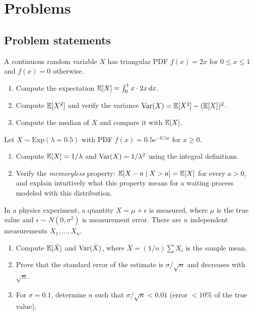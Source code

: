 \section*{Problems}

\subsection*{Problem statements}

\begin{problema}
	\label{prob:4e01dbd}
	A continuous random variable $X$ has triangular PDF $f(x) = 2x$ for $0 \le x \le 1$ and $f(x) = 0$ otherwise.
	\begin{enumerate}
		\item Compute the expectation $\mathbb{E}[X] = \int_{0}^{1} x \cdot 2x\,dx$.
		\item Compute $\mathbb{E}[X^{2}]$ and verify the variance $\operatorname{Var}(X) = \mathbb{E}[X^{2}] - (\mathbb{E}[X])^{2}$.
		\item Compute the median of $X$ and compare it with $\mathbb{E}[X]$.
	\end{enumerate}
\end{problema}

\begin{problema}
	\label{prob:f43c638}
	Let $X \sim \text{Exp}(\lambda = 0.5)$ with PDF $f(x) = 0.5 e^{-0.5 x}$ for $x \ge 0$.
	\begin{enumerate}
		\item Compute $\mathbb{E}[X] = 1/\lambda$ and $\operatorname{Var}(X) = 1/\lambda^{2}$ using the integral definitions.
		\item Verify the \emph{memoryless} property: $\mathbb{E}[X - a \mid X > a] = \mathbb{E}[X]$ for every $a > 0$, and explain intuitively what this property means for a waiting process modeled with this distribution.
	\end{enumerate}
\end{problema}

\begin{problema}
	\label{prob:7b147c4}
	In a physics experiment, a quantity $X = \mu + \epsilon$ is measured, where $\mu$ is the true value and $\epsilon \sim N(0, \sigma^{2})$ is measurement error. There are $n$ independent measurements $X_{1}, \dots, X_{n}$.
	\begin{enumerate}
		\item Compute $\mathbb{E}[\bar{X}]$ and $\operatorname{Var}(\bar{X})$, where $\bar{X} = (1/n) \sum X_{i}$ is the sample mean.
		\item Prove that the standard error of the estimate is $\sigma/\sqrt{n}$ and decreases with $\sqrt{n}$.
		\item For $\sigma = 0.1$, determine $n$ such that $\sigma/\sqrt{n} < 0.01$ (error $< 10\%$ of the true value).
	\end{enumerate}
\end{problema}

